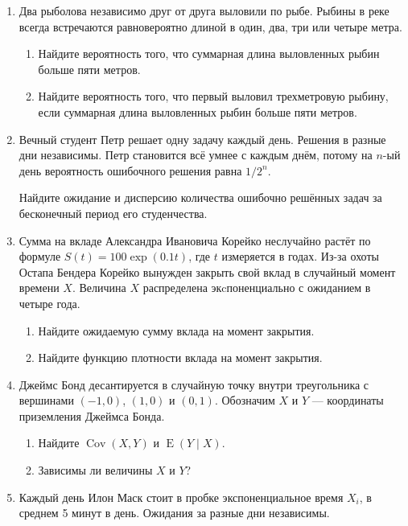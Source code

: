 \documentclass[12pt]{article}
\DeclareMathOperator{\Cov}{Cov}
\DeclareMathOperator{\E}{E}
\begin{document}
\begin{enumerate}
  \item Два рыболова независимо друг от друга выловили по рыбе. 
  Рыбины в реке всегда встречаются равновероятно длиной в один, два, три или четыре метра.  

  \begin{enumerate}
    \item Найдите вероятность того, что суммарная длина выловленных рыбин больше пяти метров.
    \item Найдите вероятность того, что первый выловил трехметровую рыбину, если суммарная длина выловленных рыбин больше пяти метров.
  \end{enumerate}

  \item Вечный студент Петр решает одну задачу каждый день. Решения в разные дни независимы. 
  Петр становится всё умнее с каждым днём, потому на $n$-ый день вероятность ошибочного решения равна $1/2^n$. 
  

  Найдите ожидание и дисперсию количества ошибочно решённых задач за бесконечный период его студенчества. 

  \item Сумма на вкладе Александра Ивановича Корейко неслучайно растёт по формуле $S(t) = 100\exp(0.1t)$, где $t$ измеряется в годах. 
  Из-за охоты Остапа Бендера Корейко вынужден закрыть свой вклад в случайный момент времени $X$. 
  Величина $X$ распределена экcпоненциально с ожиданием в четыре года.

  \begin{enumerate}
    \item Найдите ожидаемую сумму вклада на момент закрытия. 
    \item Найдите функцию плотности вклада на момент закрытия. 
  \end{enumerate}

  \item Джеймс Бонд десантируется в случайную точку внутри треугольника с вершинами $(-1, 0)$, $(1, 0)$
  и $(0, 1)$. Обозначим $X$ и $Y$ — координаты приземления Джеймса Бонда. 

  \begin{enumerate}
    \item Найдите $\Cov(X, Y)$ и $\E(Y \mid X)$.
    \item Зависимы ли величины $X$ и $Y$?
  \end{enumerate}

  \item Каждый день Илон Маск стоит в пробке экспоненциальное время $X_i$, в среднем 5 минут в день. 
  Ожидания за разные дни независимы. 


\end{enumerate}
\end{document}
